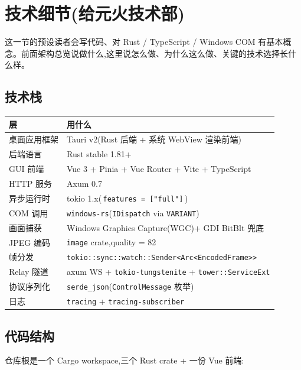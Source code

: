 \section{技术细节(给元火技术部)}

这一节的预设读者会写代码、对 Rust / TypeScript / Windows COM 有基本概念。前面架构总览说做什么,这里说怎么做、为什么这么做、关键的技术选择长什么样。

\subsection{技术栈}

\begin{center}\small
\begin{tabularx}{\linewidth}{l X}
\toprule
\textbf{层} & \textbf{用什么} \\
\midrule
桌面应用框架      & Tauri v2(Rust 后端 + 系统 WebView 渲染前端) \\
后端语言          & Rust stable 1.81+ \\
GUI 前端          & Vue 3 + Pinia + Vue Router + Vite + TypeScript \\
HTTP 服务         & Axum 0.7 \\
异步运行时        & tokio 1.x(\,\texttt{features = ["full"]}\,) \\
COM 调用          & \texttt{windows-rs}(\texttt{IDispatch} via \texttt{VARIANT}) \\
画面捕获          & Windows Graphics Capture(WGC)+ GDI BitBlt 兜底 \\
JPEG 编码         & \texttt{image} crate,quality = 82 \\
帧分发            & \texttt{tokio::sync::watch::Sender<Arc<EncodedFrame>>} \\
Relay 隧道        & axum WS + \texttt{tokio-tungstenite} + \texttt{tower::ServiceExt} \\
协议序列化        & \texttt{serde\_json}(\texttt{ControlMessage} 枚举) \\
日志              & \texttt{tracing} + \texttt{tracing-subscriber} \\
\bottomrule
\end{tabularx}
\end{center}

\subsection{代码结构}

仓库根是一个 Cargo workspace,三个 Rust crate + 一份 Vue 前端:

